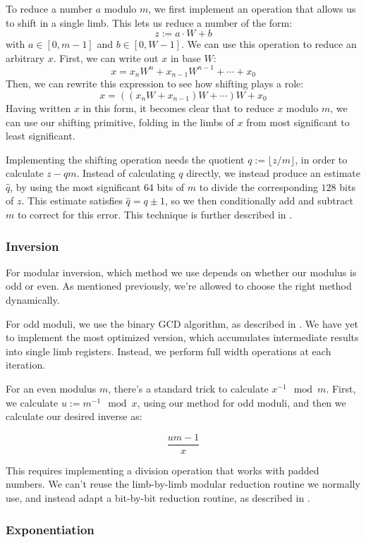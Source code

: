 \documentclass[11pt, a4paper]{article} %
\begin{document}
{To reduce a number $a$ modulo $m$, we first implement an operation
that allows us to shift in a single limb. This
lets us reduce a number
of the form:
$$
z := a \cdot W + b
$$
with $a \in [0, m - 1]$ and $b \in [0, W - 1]$. We can use
this operation to reduce an arbitrary $x$. First, we can
write out
$x$ in base $W$:
$$
x = x_n W^n + x_{n -1}W^{n - 1} + \cdots + x_0
$$
Then, we can rewrite this expression to see how
shifting plays a role:
$$
x = ((x_n W + x_{n - 1})W + \cdots)W + x_0
$$
Having written $x$ in this form, it becomes clear that to reduce
$x$ modulo $m$, we can use our shifting primitive, folding
in the limbs of $x$ from most significant to least significant.

Implementing the shifting operation needs
the quotient $q := \lfloor z / m \rfloor$,
in order to calculate $z - q m$.
Instead of calculating $q$ directly, we instead
produce an estimate $\hat{q}$, by using the most significant
$64$ bits of $m$ to divide the corresponding $128$ bits of $z$.
This estimate satisfies $\hat{q} = q \pm 1$, so we then
conditionally add and subtract $m$ to correct
for this error.
This technique is further described in \cite{pornin_bearssl_2020-1}.

\subsubsection{Inversion}

For modular inversion, which method we use depends on whether
our modulus is odd or even. As mentioned previously,
we're allowed to choose the right method dynamically.

For odd moduli, we use
the binary GCD algorithm, as described in \cite{pornin_optimized_2020}.
We have yet to implement the most optimized version, which accumulates
intermediate results into single limb registers. Instead, we
perform full width operations at each iteration.

For an even modulus $m$,
there's a standard trick to calculate $x^{-1} \mod m$.
First, we calculate
$u := m^{-1} \mod x$,
using our method for odd moduli,
and then we calculate our desired inverse as:

$$
\frac{um - 1}{x}
$$

This requires implementing a division operation that works
with padded numbers. We can't reuse the
limb-by-limb modular reduction
routine we normally use, and instead adapt
a bit-by-bit reduction routine, as described in
\cite{pornin_bearssl_2020-1}.

\subsubsection{Exponentiation}

}
\end{document}

